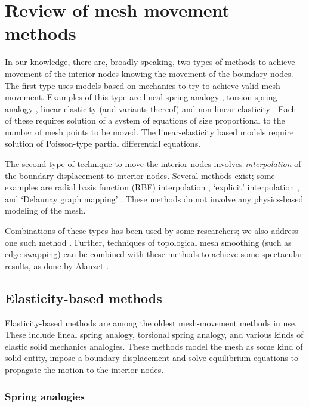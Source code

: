 \chapter{Review of mesh movement methods}

 In our knowledge, there are, broadly speaking, two types of methods to achieve movement of the interior nodes knowing the movement of the boundary nodes. The first type uses models based on mechanics to try to achieve valid mesh movement. Examples of this type are lineal spring analogy \cite{mm:batina}, torsion spring analogy \cite{mm:torsionsprings}, linear-elasticity (and variants thereof)\cite{curve:hartmann} and non-linear elasticity \cite{curve:persson}. Each of these requires solution of a system of equations of size proportional to the number of mesh points to be moved. The linear-elasticity based models require solution of Poisson-type partial differential equations.
 
 The second type of technique to move the interior nodes involves \emph{interpolation} of the boundary displacement to interior nodes. Several methods exist; some examples are radial basis function (RBF) interpolation \cite{mm:rbf}, `explicit' interpolation \cite{mm:explicit}, and `Delaunay graph mapping' \cite{mm:dgm}. These methods do not involve any physics-based modeling of the mesh.
 
 Combinations of these types has been used by some researchers; we also address one such method \cite{mm:hybriddg}. Further, techniques of topological mesh smoothing (such as edge-swapping) can be combined with these methods to achieve some spectacular results, as done by Alauzet \cite{mm:alauzet}.
 
 \section{Elasticity-based methods}
 Elasticity-based methods are among the oldest mesh-movement methods in use. These include lineal spring analogy, torsional spring analogy, and various kinds of elastic solid mechanics analogies. These methods model the mesh as some kind of solid entity, impose a boundary displacement and solve equilibrium equations to propagate the motion to the interior nodes.
 
 \subsection{Spring analogies}
 
